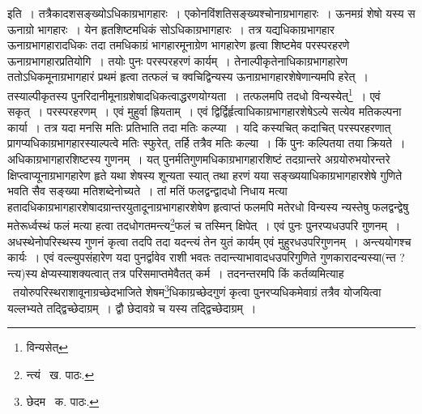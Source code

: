 \documentclass[11pt, openany]{book}
\begin{document}
\noindent इति~। तत्रैकादशसङ्ख्योऽधिकाग्रभागहारः~। एकोनविंशतिसङ्ख्यश्चोनाग्रभागहारः~। ऊनमग्रं शेषो यस्य स ऊनाग्रो भागहारः~। येन हृतशिष्टमधिकं सोऽधिकाग्रभागहारः~। तत्र यद्यधिकाग्रभागहार ऊनाग्रभागहारादधिकः तदा तमधिकाग्रं भागहारमूनाग्रेण भागहारेण हृत्वा शिष्टमेव परस्परहरणे ऊनाग्रभागहारप्रतियोगि~। तयोः पुनः परस्परहरणं कार्यम्~। तेनाल्पीकृतेनाधिकाग्रभागहारेण ततोऽधिकमूनाग्रभागहारं प्रथमं हृत्वा तत्फलं च क्वचिद्विन्यस्य ऊनाग्रभागहारशेषेणान्यमपि हरेत्~। तस्याल्पीकृतस्य पुनरिदानीमूनाग्रशेषादधिकत्वाद्धरणयोग्यता~। तत्फलमपि तदधो विन्यस्येत्\renewcommand{\thefootnote}{१}\footnote{विन्यसेत्}~। एवं सकृत्~। परस्परहरणम्~। एवं मुहुर्वा ह्रियताम्~। एवं द्विर्द्विर्हृत्वाधिकाग्रभागहारशेषेऽल्पे सत्येव मतिकल्पना कार्या~। तत्र यदा मनसि मतिः प्रतिभाति तदा मतिः कल्प्या~। यदि कस्यचित् कदाचित् परस्परहरणात् प्रागप्यधिकाग्रभागहारस्याल्पत्वे मतिः स्फुरेत्, तर्हि तत्रैव मतिः कल्या~। किं पुनः कल्पितया तया क्रियते~। अधिकाग्रभागहारशिष्टस्य गुणनम्~। यत् पुनर्मतिगुणमधिकाग्रभागहारशिष्टं तदग्रान्तरे अग्रयोरुभयोरन्तरे
क्षिप्त्वाप्यूनाग्रभागहारेण हृते यथा शेषस्य शून्यता स्यात् तथा हरणं यया सङ्ख्ययाधिकाग्रभागहारशेषे गुणिते भवति सैव सङ्ख्या मतिशब्देनोच्यते~। तां मतिं फलद्वन्द्वादधो निधाय मत्या हतादधिकाग्रभागहारशेषादग्रान्तरयुतादूनाग्रभागहारशेषेण हृत्वाप्तं फलमपि मतेरधो विन्यस्य न्यस्तेषु फलद्वन्द्वेषु मतेरूर्ध्वस्थं फलं मत्या हत्वा तदधोगतमन्त्य\renewcommand{\thefootnote}{२}\footnote{न्त्यं \textendash\ ख. पाठः.}फलं च तस्मिन् क्षिपेत्~। एवं पुनः पुनरप्यधउपरि गुणनम्~। अधस्थेनोपरिस्थस्य गुणनं कृत्वा तदपि तदा यदन्त्यं तेन युतं कार्यम् एवं मुहुरधउपरिगुणनम्~। अन्त्ययोगश्च कार्यः~। एवं वल्ल्युपसंहारेण यदा पुनर्द्वावेव राशी भवतः तदान्त्याभावादधउपरिगुणिते गुणकारादन्यस्या(न्त ? न्त्य)स्य क्षेप्यस्याशक्यत्वात् तत्र परिसमाप्तमेवैतत् कर्म~। तदनन्तरमपि किं कर्तव्यमित्याह \textendash\ तयोरुपरिस्थराशावूनाग्रच्छेदभाजिते शेषम\renewcommand{\thefootnote}{३}\footnote{छेदम \textendash\ क. पाठः.}धिकाग्रच्छेदगुणं कृत्वा पुनरप्यधिकमेवाग्रं तत्रैव योजयित्वा यल्लभ्यते तद्द्विच्छेदाग्रम्~। द्वौ छेदावग्रे च यस्य तद्द्विच्छेदाग्रम्~।

\newpage
\end{document}

